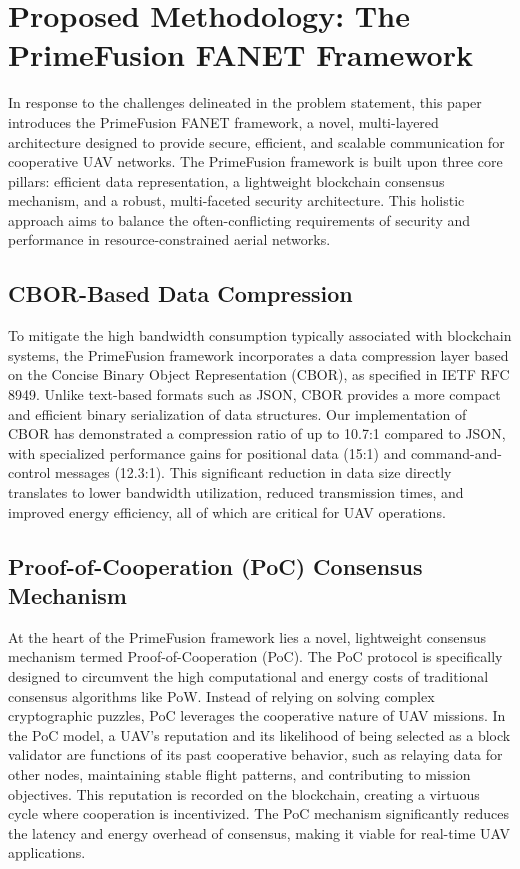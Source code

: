 \section{Proposed Methodology: The PrimeFusion FANET Framework}
\label{sec:methodology}

In response to the challenges delineated in the problem statement, this paper introduces the PrimeFusion FANET framework, a novel, multi-layered architecture designed to provide secure, efficient, and scalable communication for cooperative UAV networks. The PrimeFusion framework is built upon three core pillars: efficient data representation, a lightweight blockchain consensus mechanism, and a robust, multi-faceted security architecture. This holistic approach aims to balance the often-conflicting requirements of security and performance in resource-constrained aerial networks.

\subsection{CBOR-Based Data Compression}
To mitigate the high bandwidth consumption typically associated with blockchain systems, the PrimeFusion framework incorporates a data compression layer based on the Concise Binary Object Representation (CBOR), as specified in IETF RFC 8949. Unlike text-based formats such as JSON, CBOR provides a more compact and efficient binary serialization of data structures. Our implementation of CBOR has demonstrated a compression ratio of up to 10.7:1 compared to JSON, with specialized performance gains for positional data (15:1) and command-and-control messages (12.3:1). This significant reduction in data size directly translates to lower bandwidth utilization, reduced transmission times, and improved energy efficiency, all of which are critical for UAV operations.

\subsection{Proof-of-Cooperation (PoC) Consensus Mechanism}
At the heart of the PrimeFusion framework lies a novel, lightweight consensus mechanism termed Proof-of-Cooperation (PoC). The PoC protocol is specifically designed to circumvent the high computational and energy costs of traditional consensus algorithms like PoW. Instead of relying on solving complex cryptographic puzzles, PoC leverages the cooperative nature of UAV missions. In the PoC model, a UAV's reputation and its likelihood of being selected as a block validator are functions of its past cooperative behavior, such as relaying data for other nodes, maintaining stable flight patterns, and contributing to mission objectives. This reputation is recorded on the blockchain, creating a virtuous cycle where cooperation is incentivized. The PoC mechanism significantly reduces the latency and energy overhead of consensus, making it viable for real-time UAV applications.

